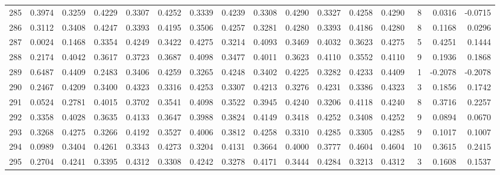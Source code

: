 \begin{tabular}{lrrrrrrrrrrrrrrr}
285 &      0.3974 &  0.3259 &  0.4229 &  0.3307 &  0.4252 &  0.3339 &  0.4239 &  0.3308 &  0.4290 &  0.3327 &   0.4258 &     0.4290 &      8 &                    0.0316 &                    -0.0715 \\
286 &      0.3112 &  0.3408 &  0.4247 &  0.3393 &  0.4195 &  0.3506 &  0.4257 &  0.3281 &  0.4280 &  0.3393 &   0.4186 &     0.4280 &      8 &                    0.1168 &                     0.0296 \\
287 &      0.0024 &  0.1468 &  0.3354 &  0.4249 &  0.3422 &  0.4275 &  0.3214 &  0.4093 &  0.3469 &  0.4032 &   0.3623 &     0.4275 &      5 &                    0.4251 &                     0.1444 \\
288 &      0.2174 &  0.4042 &  0.3617 &  0.3723 &  0.3687 &  0.4098 &  0.3477 &  0.4011 &  0.3623 &  0.4110 &   0.3552 &     0.4110 &      9 &                    0.1936 &                     0.1868 \\
289 &      0.6487 &  0.4409 &  0.2483 &  0.3406 &  0.4259 &  0.3265 &  0.4248 &  0.3402 &  0.4225 &  0.3282 &   0.4233 &     0.4409 &      1 &                   -0.2078 &                    -0.2078 \\
290 &      0.2467 &  0.4209 &  0.3400 &  0.4323 &  0.3316 &  0.4253 &  0.3307 &  0.4213 &  0.3276 &  0.4231 &   0.3386 &     0.4323 &      3 &                    0.1856 &                     0.1742 \\
291 &      0.0524 &  0.2781 &  0.4015 &  0.3702 &  0.3541 &  0.4098 &  0.3522 &  0.3945 &  0.4240 &  0.3206 &   0.4118 &     0.4240 &      8 &                    0.3716 &                     0.2257 \\
292 &      0.3358 &  0.4028 &  0.3635 &  0.4133 &  0.3647 &  0.3988 &  0.3824 &  0.4149 &  0.3418 &  0.4252 &   0.3408 &     0.4252 &      9 &                    0.0894 &                     0.0670 \\
293 &      0.3268 &  0.4275 &  0.3266 &  0.4192 &  0.3527 &  0.4006 &  0.3812 &  0.4258 &  0.3310 &  0.4285 &   0.3305 &     0.4285 &      9 &                    0.1017 &                     0.1007 \\
294 &      0.0989 &  0.3404 &  0.4261 &  0.3343 &  0.4273 &  0.3204 &  0.4131 &  0.3664 &  0.4000 &  0.3777 &   0.4604 &     0.4604 &     10 &                    0.3615 &                     0.2415 \\
295 &      0.2704 &  0.4241 &  0.3395 &  0.4312 &  0.3308 &  0.4242 &  0.3278 &  0.4171 &  0.3444 &  0.4284 &   0.3213 &     0.4312 &      3 &                    0.1608 &                     0.1537 \\

\end{tabular}

